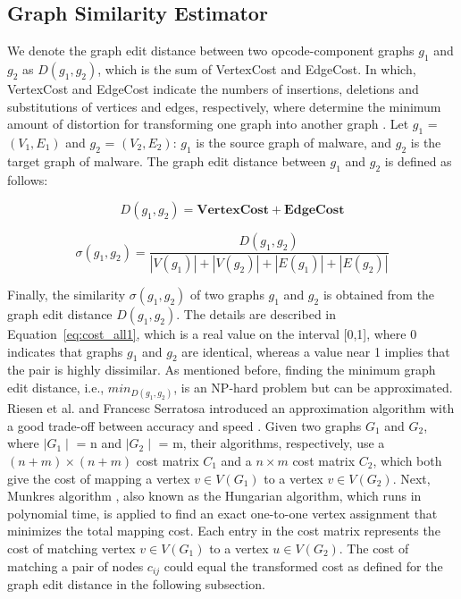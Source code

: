 \subsection{Graph Similarity Estimator}

We denote the graph edit distance between two opcode-component graphs $g_{1}$ and $g_{2}$ as $D(g_{1}, g_{2})$, which is the sum of VertexCost and EdgeCost. In which, VertexCost and EdgeCost indicate the numbers of insertions, deletions and substitutions of vertices and edges, respectively, where determine the minimum amount of distortion for transforming one graph into another graph  \cite{p:Fankhauser11}. Let $g_{1}$ = $(V_{1}, E_{1})$  and $g_{2}$ = $(V_{2}, E_{2})$: $g_{1}$ is the source graph of malware, and $g_{2}$ is the target graph of malware. The graph edit distance between $g_{1}$ and $g_{2}$ is defined as follows:

\begin{equation}
        \label{eq:ged}
        D(g_{1}, g_{2}) = \mathbf{VertexCost} + \mathbf{EdgeCost}
\end{equation}

\begin{equation}
        \label{eq:cost_all1}
\sigma (g_{1},g_{2}) = \frac{D(g_{1}, g_{2})}{\left | V(g_{1}) \right | + \left | V(g_{2}) \right | +\left | E(g_{1}) \right | + \left | E(g_{2}) \right |}
\end{equation}

Finally, the similarity $\sigma (g_{1},g_{2}) $ of two graphs $g_{1}$ and $g_{2}$ is obtained from the graph edit distance $D(g_{1}, g_{2})$. The details are described in Equation~\ref{eq:cost_all1}, which is a real value on the interval [0,1], where 0 indicates that graphs $g_{1}$ and $g_{2}$ are identical, whereas a value near 1 implies that the pair is highly dissimilar. As mentioned before, finding the minimum graph edit distance, i.e., $min_{D(g_{1}, g_{2})}$, is an NP-hard problem but can be approximated. Riesen et al. and  Francesc Serratosa introduced an approximation algorithm with a good trade-off between accuracy and speed \cite{p:Riesen09} \cite{p:Serratosa14}. Given two graphs $G_{1}$ and $G_{2}$, where $\mid G_{1}\mid$ = n and $\mid G_{2}\mid$ = m, their algorithms, respectively, use a $(n+m) \times (n+m)$ cost matrix $C_{1}$ and a $n \times m$ cost matrix $C_{2}$, which both give the cost of mapping a vertex $v \in V(G_{1})$ to a vertex $v \in V(G_{2})$. Next,  Munkres algorithm \cite{p:Munkres57}, also known as the Hungarian algorithm, which runs in polynomial time, is applied to find an exact one-to-one vertex assignment  that minimizes the total mapping cost. Each entry in the cost matrix represents the cost of matching vertex $v \in V(G_{1})$ to a vertex $u \in V(G_{2})$. The cost of matching a pair of nodes $c_{ij}$ could equal the transformed cost as defined for the graph edit distance in the following subsection.

